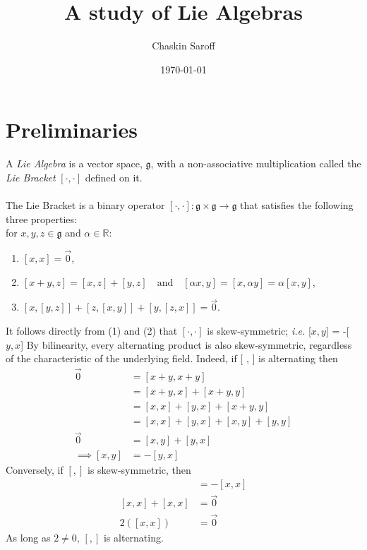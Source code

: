 \documentclass[11 pt]{article}
\title{A study of Lie Algebras}
\author{Chaskin Saroff}
\date{\today} \draft
\renewcommand{\a}{\alpha}
\newcommand{\fg}{\mathfrak{g}}
\newcommand{\RR}{\mathbb{R}}
\begin{document}
\maketitle


\section{Preliminaries}

\begin{definition}

    A \emph{Lie Algebra} is a vector space, $\fg$, with a non-associative
    multiplication called the \emph{Lie Bracket} $[\cdot,\cdot]$ defined on it.
\\
\\The Lie Bracket is a binary operator $ [\cdot,\cdot]: \fg \times \fg \to \fg$
that satisfies the following three properties:
\\for $x,y,z \in \fg$ and $\a \in \RR$:
\begin{enumerate}
    \item  $[x,x]=\Vec{0}$,

    \item  $[x+y,z] = [x,z]+[y,z]\quad
        \text{and} \quad [\a x,y]=[x, \a y]=\a[x, y]$,

    \item  $[x,[y,z]] + [z,[x,y]] + [y,[z,x]] = \Vec{0}$.
\end{enumerate}
\end{definition}
It follows directly from (1) and (2) that $[\cdot,\cdot]$ is skew-symmetric;
\emph{i.e.} [$x,y$] = -[$y,x$] By bilinearity, every alternating product is
also skew-symmetric, regardless of the characteristic of the underlying field.
Indeed, if [ , ] is alternating then
    \begin{align}
        \Vec{0} &= [x + y, x + y]
        \\&= [x + y, x] + [x + y, y]
        \\&= [x,x] + [y, x] + [x + y, y]
        \\&= [x,x] + [y, x] + [x, y] + [y, y]
        \\\Vec{0}&=         [x, y] + [y, x]
        \\\implies [x,y] &= -[y,x]
    \end{align}
    Conversely, if $[,]$ is skew-symmetric, then
    \begin{align}
        [x,x] &= -[x,x]
        \\ [x,x]+[x,x]&=\Vec{0}
        \\ 2([x,x])&=\Vec{0}
    \end{align}
    As long as $2 \neq 0$, $[,]$ is alternating.
\end{document}
